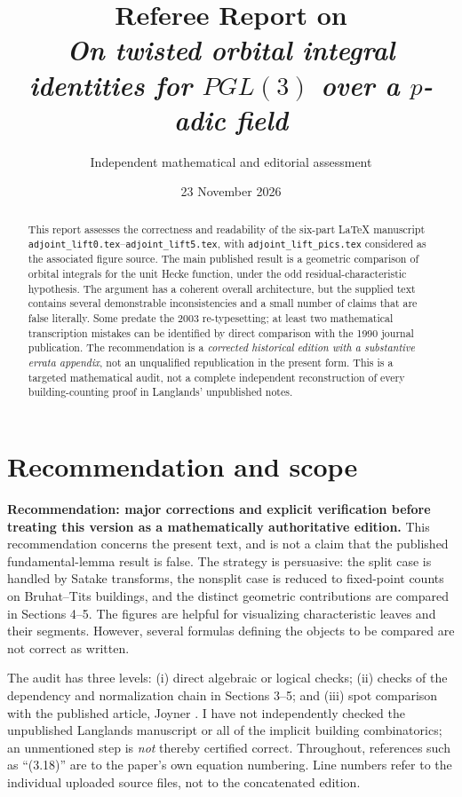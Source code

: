 \documentclass[12pt,letterpaper]{article}
\title{Referee Report on\\[4pt]
\emph{On twisted orbital integral identities for $PGL(3)$ over a $p$-adic field}}
\author{Independent mathematical and editorial assessment}
\date{23 November 2026}
\begin{document}
\maketitle

\begin{abstract}
This report assesses the correctness and readability of the six-part
\LaTeX{} manuscript \texttt{adjoint\_lift0.tex}--\texttt{adjoint\_lift5.tex},
with \texttt{adjoint\_lift\_pics.tex} considered as the associated figure
source. The main published result is a geometric comparison of orbital
integrals for the unit Hecke function, under the odd residual-characteristic
hypothesis. The argument has a coherent overall architecture, but the supplied
text contains several demonstrable inconsistencies and a small number of
claims that are false literally. Some predate the 2003 re-typesetting; at
least two mathematical transcription mistakes can be identified by direct
comparison with the 1990 journal publication. The recommendation is a
\emph{corrected historical edition with a substantive errata appendix}, not
an unqualified republication in the present form. This is a targeted
mathematical audit, not a complete independent reconstruction of every
building-counting proof in Langlands' unpublished notes.
\end{abstract}

\section{Recommendation and scope}

\noindent\textbf{Recommendation: major corrections and explicit verification
before treating this version as a mathematically authoritative edition.}
This recommendation concerns the present text, and is not a claim that the
published fundamental-lemma result is false. The strategy is persuasive: the
split case is handled by Satake transforms, the nonsplit case is reduced to
fixed-point counts on Bruhat--Tits buildings, and the distinct geometric
contributions are compared in Sections 4--5. The figures are helpful for
visualizing characteristic leaves and their segments. However, several
formulas defining the objects to be compared are not correct as written.

The audit has three levels: (i) direct algebraic or logical checks;
(ii) checks of the dependency and normalization chain in Sections 3--5;
and (iii) spot comparison with the published article, Joyner
\cite{Joyner1990}. I have not independently checked the unpublished
Langlands manuscript or all of the implicit building combinatorics; an
unmentioned step is \emph{not} thereby certified correct. Throughout,
references such as ``(3.18)'' are to the paper's own equation numbering.
Line numbers refer to the individual uploaded source files, not to the
concatenated edition.
\end{document}
